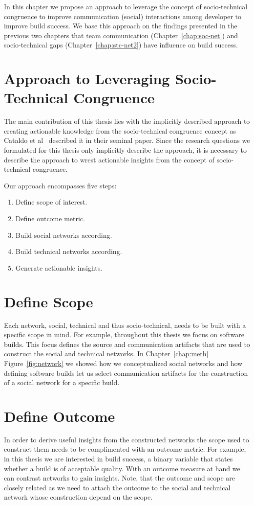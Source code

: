 \label{chap:approach}
In this chapter we propose an approach to leverage the concept of socio-technical congruence to improve communication (social) interactions among developer to improve build success.
We base this approach on the findings presented in the previous two chapters that team communication (Chapter~\ref{chap:soc-net}) and socio-technical gaps (Chapter~\ref{chap:stc-net2}) have influence on build success.

\section{Approach to Leveraging Socio-Technical Congruence}
The main contribution of this thesis lies with the implicitly described approach to creating actionable knowledge from the socio-technical congruence concept as Cataldo et al~\cite{cataldo:cscw:2006} described it in their seminal paper.
Since the research questions we formulated for this thesis only implicitly describe the approach, it is necessary to describe the approach to wrest actionable insights from the concept of socio-technical congruence.

Our approach encompasses five steps:
\begin{enumerate}
\item Define scope of interest.
\item Define outcome metric.
\item Build social networks according.
\item Build technical networks according.
\item Generate actionable insights.
\end{enumerate}

\section{Define Scope} 
Each network, social, technical and thus socio-technical, needs to be built with a specific scope in mind.
For example, throughout this thesis we focus on software builds.
This focus defines the source and communication artifacts that are used to construct the social and technical networks.
In Chapter~\ref{chap:meth} Figure~\ref{fig:network} we showed how we conceptualized social networks and how defining software builds let us select communication artifacts for the construction of a social network for a specific build.

\section{Define Outcome}
In order to derive useful insights from the constructed networks the scope used to construct them needs to be complimented with an outcome metric.
For example, in this thesis we are interested in build success, a binary variable that states whether a build is of acceptable quality.
With an outcome measure at hand we can contrast networks to gain insights.
Note, that the outcome and scope are closely related as we need to attach the outcome to the social and technical network whose construction depend on the scope.

